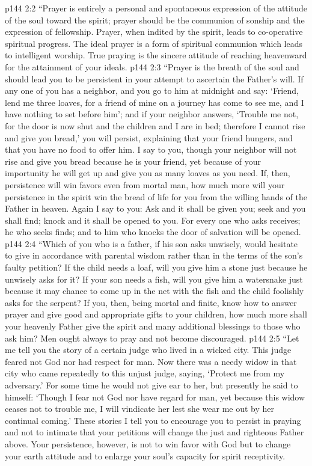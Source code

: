 \vs p144 2:2 \textcolor{ubdarkred}{“Prayer is entirely a personal and spontaneous expression of the attitude of the soul toward the spirit; prayer should be the communion of sonship and the expression of fellowship. Prayer, when indited by the spirit, leads to co\hyp{}operative spiritual progress. The ideal prayer is a form of spiritual communion which leads to intelligent worship. True praying is the sincere attitude of reaching heavenward for the attainment of your ideals.}
\vs p144 2:3 \textcolor{ubdarkred}{“Prayer is the breath of the soul and should lead you to be persistent in your attempt to ascertain the Father’s will. If any one of you has a neighbor, and you go to him at midnight and say: ‘Friend, lend me three loaves, for a friend of mine on a journey has come to see me, and I have nothing to set before him’; and if your neighbor answers, ‘Trouble me not, for the door is now shut and the children and I are in bed; therefore I cannot rise and give you bread,’ you will persist, explaining that your friend hungers, and that you have no food to offer him. I say to you, though your neighbor will not rise and give you bread because he is your friend, yet because of your importunity he will get up and give you as many loaves as you need. If, then, persistence will win favors even from mortal man, how much more will your persistence in the spirit win the bread of life for you from the willing hands of the Father in heaven. Again I say to you: Ask and it shall be given you; seek and you shall find; knock and it shall be opened to you. For every one who asks receives; he who seeks finds; and to him who knocks the door of salvation will be opened.}
\vs p144 2:4 \textcolor{ubdarkred}{“Which of you who is a father, if his son asks unwisely, would hesitate to give in accordance with parental wisdom rather than in the terms of the son’s faulty petition? If the child needs a loaf, will you give him a stone just because he unwisely asks for it? If your son needs a fish, will you give him a watersnake just because it may chance to come up in the net with the fish and the child foolishly asks for the serpent? If you, then, being mortal and finite, know how to answer prayer and give good and appropriate gifts to your children, how much more shall your heavenly Father give the spirit and many additional blessings to those who ask him? Men ought always to pray and not become discouraged.}
\vs p144 2:5 \textcolor{ubdarkred}{“Let me tell you the story of a certain judge who lived in a wicked city. This judge feared not God nor had respect for man. Now there was a needy widow in that city who came repeatedly to this unjust judge, saying, ‘Protect me from my adversary.’ For some time he would not give ear to her, but presently he said to himself: ‘Though I fear not God nor have regard for man, yet because this widow ceases not to trouble me, I will vindicate her lest she wear me out by her continual coming.’ These stories I tell you to encourage you to persist in praying and not to intimate that your petitions will change the just and righteous Father above. Your persistence, however, is not to win favor with God but to change your earth attitude and to enlarge your soul’s capacity for spirit receptivity.}
